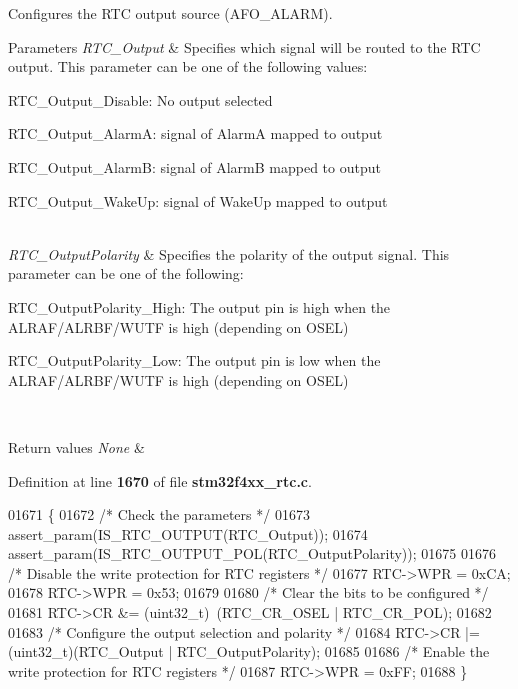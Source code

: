 Configures the R\+TC output source (A\+F\+O\+\_\+\+A\+L\+A\+RM). 


\begin{DoxyParams}{Parameters}
{\em R\+T\+C\+\_\+\+Output} & Specifies which signal will be routed to the R\+TC output. This parameter can be one of the following values\+: \begin{DoxyItemize}
\item R\+T\+C\+\_\+\+Output\+\_\+\+Disable\+: No output selected \item R\+T\+C\+\_\+\+Output\+\_\+\+AlarmA\+: signal of AlarmA mapped to output \item R\+T\+C\+\_\+\+Output\+\_\+\+AlarmB\+: signal of AlarmB mapped to output \item R\+T\+C\+\_\+\+Output\+\_\+\+Wake\+Up\+: signal of Wake\+Up mapped to output \end{DoxyItemize}
\\
\hline
{\em R\+T\+C\+\_\+\+Output\+Polarity} & Specifies the polarity of the output signal. This parameter can be one of the following\+: \begin{DoxyItemize}
\item R\+T\+C\+\_\+\+Output\+Polarity\+\_\+\+High\+: The output pin is high when the A\+L\+R\+A\+F/\+A\+L\+R\+B\+F/\+W\+U\+TF is high (depending on O\+S\+EL) \item R\+T\+C\+\_\+\+Output\+Polarity\+\_\+\+Low\+: The output pin is low when the A\+L\+R\+A\+F/\+A\+L\+R\+B\+F/\+W\+U\+TF is high (depending on O\+S\+EL) \end{DoxyItemize}
\\
\hline
\end{DoxyParams}

\begin{DoxyRetVals}{Return values}
{\em None} & \\
\hline
\end{DoxyRetVals}


Definition at line \textbf{ 1670} of file \textbf{ stm32f4xx\+\_\+rtc.\+c}.


\begin{DoxyCode}
01671 \{
01672   \textcolor{comment}{/* Check the parameters */}
01673   assert_param(IS_RTC_OUTPUT(RTC\_Output));
01674   assert_param(IS_RTC_OUTPUT_POL(RTC\_OutputPolarity));
01675 
01676   \textcolor{comment}{/* Disable the write protection for RTC registers */}
01677   RTC->WPR = 0xCA;
01678   RTC->WPR = 0x53;
01679 
01680   \textcolor{comment}{/* Clear the bits to be configured */}
01681   RTC->CR &= (uint32\_t)~(RTC_CR_OSEL | RTC_CR_POL);
01682 
01683   \textcolor{comment}{/* Configure the output selection and polarity */}
01684   RTC->CR |= (uint32\_t)(RTC\_Output | RTC\_OutputPolarity);
01685 
01686   \textcolor{comment}{/* Enable the write protection for RTC registers */}
01687   RTC->WPR = 0xFF; 
01688 \}
\end{DoxyCode}
